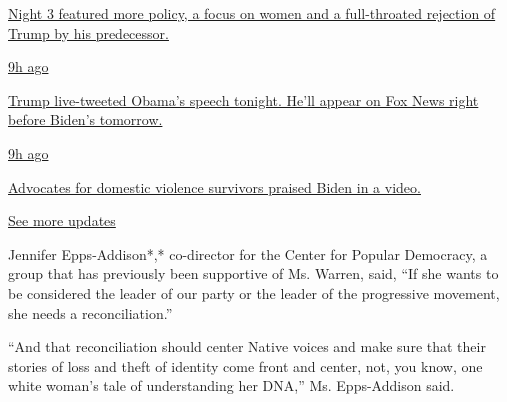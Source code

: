 \href{https://www.nytimes3xbfgragh.onion/live/2020/08/19/us/dnc-convention-election?action=click\&pgtype=Article\&state=default\&region=MAIN_CONTENT_1\&context=storylines_live_updates\#night-3-featured-more-policy-a-focus-on-women-and-a-full-throated-rejection-of-trump-by-his-predecessor}{Night
3 featured more policy, a focus on women and a full-throated rejection
of Trump by his predecessor.}

\href{https://www.nytimes3xbfgragh.onion/live/2020/08/19/us/dnc-convention-election?action=click\&pgtype=Article\&state=default\&region=MAIN_CONTENT_1\&context=storylines_live_updates\#trump-live-tweeted-obamas-speech-tonight-hell-appear-on-fox-news-right-before-bidens-tomorrow}{9h
ago}

\href{https://www.nytimes3xbfgragh.onion/live/2020/08/19/us/dnc-convention-election?action=click\&pgtype=Article\&state=default\&region=MAIN_CONTENT_1\&context=storylines_live_updates\#trump-live-tweeted-obamas-speech-tonight-hell-appear-on-fox-news-right-before-bidens-tomorrow}{Trump
live-tweeted Obama's speech tonight. He'll appear on Fox News right
before Biden's tomorrow.}

\href{https://www.nytimes3xbfgragh.onion/live/2020/08/19/us/dnc-convention-election?action=click\&pgtype=Article\&state=default\&region=MAIN_CONTENT_1\&context=storylines_live_updates\#advocates-for-domestic-violence-survivors-praised-biden-in-a-video}{9h
ago}

\href{https://www.nytimes3xbfgragh.onion/live/2020/08/19/us/dnc-convention-election?action=click\&pgtype=Article\&state=default\&region=MAIN_CONTENT_1\&context=storylines_live_updates\#advocates-for-domestic-violence-survivors-praised-biden-in-a-video}{Advocates
for domestic violence survivors praised Biden in a video.}

\href{https://www.nytimes3xbfgragh.onion/live/2020/08/19/us/dnc-convention-election?action=click\&pgtype=Article\&state=default\&region=MAIN_CONTENT_1\&context=storylines_live_updates}{See
more updates}

Jennifer Epps-Addison*,* co-director for the Center for Popular
Democracy, a group that has previously been supportive of Ms. Warren,
said, ``If she wants to be considered the leader of our party or the
leader of the progressive movement, she needs a reconciliation.''

``And that reconciliation should center Native voices and make sure that
their stories of loss and theft of identity come front and center, not,
you know, one white woman's tale of understanding her DNA,'' Ms.
Epps-Addison said.

